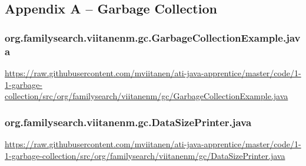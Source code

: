 \subsection*{Appendix A -- Garbage Collection} \label{App:AppendixA}

\subsubsection*{org.familysearch.viitanenm.gc.GarbageCollectionExample.java}
\noindent\begin{minipage}{.6in}
\end{minipage}
\begin{minipage}{6in}
  \url{https://raw.githubusercontent.com/mviitanen/ati-java-apprentice/master/code/1-1-garbage-collection/src/org/familysearch/viitanenm/gc/GarbageCollectionExample.java}
\end{minipage}

\vspace{1em}
\subsubsection*{org.familysearch.viitanenm.gc.DataSizePrinter.java}
\noindent\begin{minipage}{.6in}
    \end{minipage}
    \begin{minipage}{6in}    
      \url{https://raw.githubusercontent.com/mviitanen/ati-java-apprentice/master/code/1-1-garbage-collection/src/org/familysearch/viitanenm/gc/DataSizePrinter.java}
    \end{minipage}